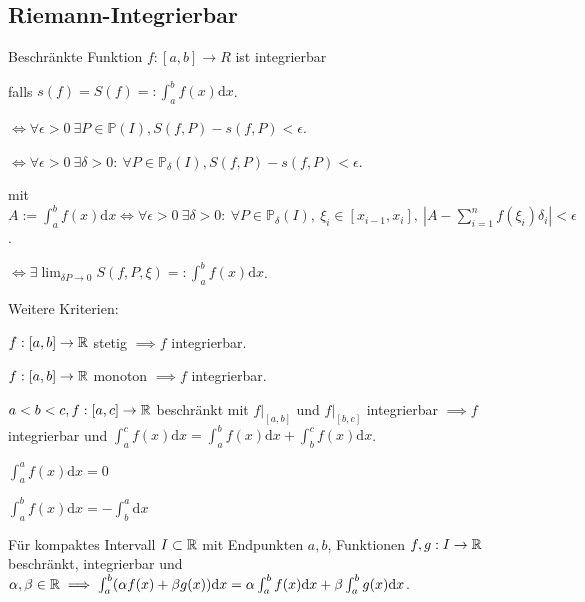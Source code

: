 \subsection{Riemann-Integrierbar}
Beschränkte Funktion $f:[a,b] \to R$ ist integrierbar
\begin{compactitem}
    \item falls $s(f) = S(f) =: \int_{a}^{b} f(x) \mathrm{d}x$.
    \item $\iff \forall \epsilon > 0 \ \exists P \in \mathbb{P}(I), S(f, P) - s(f, P) < \epsilon$.
    \item $\iff \forall \epsilon > 0 \ \exists \delta > 0: \ \forall P \in \mathbb{P}_\delta(I), S(f, P) - s(f, P) < \epsilon$.
    \item mit $A:= \int_{a}^{b} f(x) \mathrm{d}x \iff \forall \epsilon > 0 \ \exists \delta > 0: \ \forall P \in \mathbb{P}_\delta(I), \ \xi_i \in [x_{i-1}, x_i], \ \left| A - \sum_{i=1}^{n} f(\xi_i) \delta_i \right| < \epsilon$.
    \item $\iff \exists \lim_{\delta{P} \to 0} S(f, P, \xi) =: \int_{a}^{b} f(x) \mathrm{d}x$.
\end{compactitem}

Weitere Kriterien:
\begin{compactitem}
    \item $f: [a, b] \to \mathbb{R}$ stetig $\implies f$ integrierbar.
    \item $f: [a, b] \to \mathbb{R}$ monoton $\implies f$ integrierbar.
    \item $a < b < c, f: [a, c] \to \mathbb{R}$ beschränkt mit $f|_{[a,b]}$ und $f|_{[b,c]}$ integrierbar $\implies f$ integrierbar und $\int_{a}^{c} f(x) \mathrm{d}x = \int_{a}^{b} f(x) \mathrm{d}x + \int_{b}^{c} f(x) \mathrm{d}x$.
    \item
        \begin{inparaitem}
            \item $\int_{a}^{a} f(x)\mathrm{d}x = 0$
            \item $\int_{a}^{b} f(x)\mathrm{d}x = -\int_{b}^{a} \mathrm{d}x$
        \end{inparaitem}
    \item Für kompaktes Intervall $I \subset \mathbb{R}$ mit Endpunkten $a,b$, Funktionen $f, g : I \to \mathbb{R}$ beschränkt, integrierbar und $\alpha, \beta \in \mathbb{R} \implies \int_{a}^{b} (\alpha f(x) + \beta g(x)) \mathrm{d}x = \alpha \int_{a}^{b} f(x) \mathrm{d}x + \beta \int_{a}^{b} g(x)\mathrm{d}x$.
\end{compactitem}

